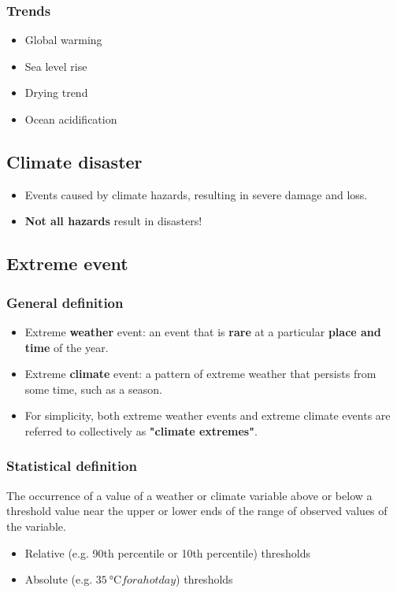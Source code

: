 \documentclass[11pt]{article}
\begin{document}
\subsubsection{Trends}
\label{sec:org6110ee7}
\begin{itemize}
\item Global warming
\item Sea level rise
\item Drying trend
\item Ocean acidification
\end{itemize}
\subsection{Climate disaster}
\label{sec:orgfbff05f}
\begin{itemize}
\item Events caused by climate hazards, resulting in severe damage and loss.
\item \textbf{Not all hazards} result in disasters!
\end{itemize}
\subsection{Extreme event}
\label{sec:orgfada680}

\subsubsection{General definition}
\label{sec:orgff35436}
\begin{itemize}
\item Extreme \textbf{weather} event: an event that is \textbf{rare} at a particular \textbf{place and time} of the year.
\item Extreme \textbf{climate} event: a pattern of extreme weather that persists from some time, such as a season.
\item For simplicity, both extreme weather events and extreme climate events are referred to collectively as \textbf{"climate extremes"}.
\end{itemize}
\subsubsection{Statistical definition}
\label{sec:orgc16c617}
The occurrence of a value of a weather or climate variable above or below a threshold value near the upper or lower ends of the range of observed values of the variable.
\begin{itemize}
\item Relative (e.g. 90th percentile or 10th percentile) thresholds
\item Absolute (e.g. \(\qty{35}{\degreeCelsius} for a hot day\)) thresholds
\end{itemize}
\end{document}
